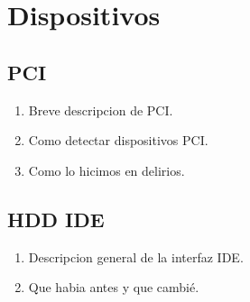 \chapter{Dispositivos}

\section{PCI}
\begin{enumerate}
  \item Breve descripcion de PCI.
  \item Como detectar dispositivos PCI.
  \item Como lo hicimos en delirios.
\end{enumerate}

\section{HDD IDE}
\begin{enumerate}
  \item Descripcion general de la interfaz IDE.
  \item Que habia antes y que cambié.
\end{enumerate}

